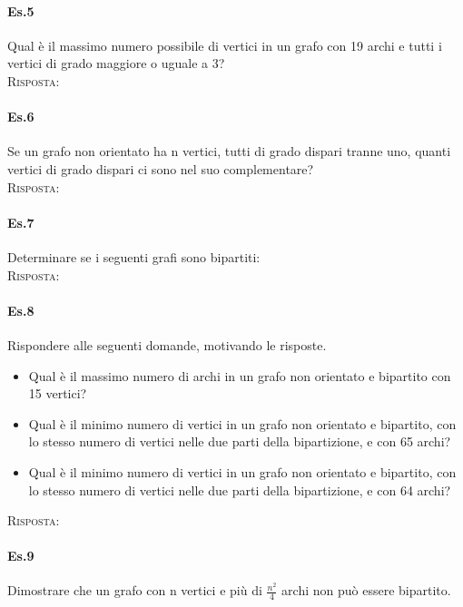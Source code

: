 \paragraph{Es.5} Qual è il massimo numero possibile di vertici in un grafo con 19 archi e tutti i vertici di grado maggiore o uguale a 3?\\

\noindent
\textsc{Risposta:}

\paragraph{Es.6} Se un grafo non orientato ha n vertici, tutti di grado dispari
tranne uno, quanti vertici di grado dispari ci sono nel suo complementare?\\

\noindent
\textsc{Risposta:}

\paragraph{Es.7} Determinare se i seguenti grafi sono bipartiti:\\

\noindent
\textsc{Risposta:}

\paragraph{Es.8} Rispondere alle seguenti domande, motivando le risposte.
\begin{itemize}
    \item Qual è il massimo numero di archi in un grafo non orientato e bipartito con 15 vertici?
    \item Qual è il minimo numero di vertici in un grafo non orientato e bipartito, con lo stesso numero di vertici nelle due parti della bipartizione, e con 65 archi?
    \item Qual è il minimo numero di vertici in un grafo non orientato e bipartito, con lo stesso numero di vertici nelle due parti della bipartizione, e con 64 archi?
\end{itemize}
\textsc{Risposta:}

\paragraph{Es.9} Dimostrare che un grafo con n vertici e più di \( \frac{n^2}{4}\) archi non può essere bipartito.\\

